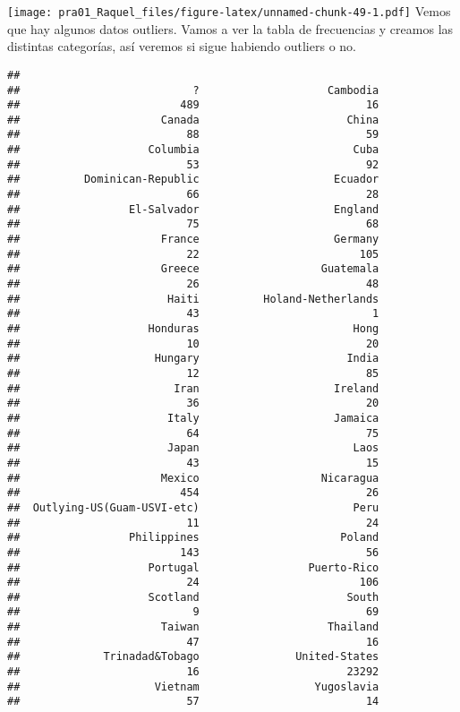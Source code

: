 \documentclass[]{article}
\newenvironment{Shaded}{\begin{snugshade}}{\end{snugshade}}
\newcommand{\DataTypeTok}[1]{\textcolor[rgb]{0.87,0.87,0.75}{#1}}
\newcommand{\KeywordTok}[1]{\textcolor[rgb]{0.94,0.87,0.69}{#1}}
\newcommand{\NormalTok}[1]{\textcolor[rgb]{0.80,0.80,0.80}{#1}}
\newcommand{\OperatorTok}[1]{\textcolor[rgb]{0.94,0.94,0.82}{#1}}
\newcommand{\StringTok}[1]{\textcolor[rgb]{0.80,0.58,0.58}{#1}}
\begin{document}
\texttt{[image: pra01\_Raquel\_files/figure-latex/unnamed-chunk-49-1.pdf]}
Vemos que hay algunos datos outliers. Vamos a ver la tabla de
frecuencias y creamos las distintas categorías, así veremos si sigue
habiendo outliers o no.

\begin{Shaded}
\end{Shaded}

\begin{verbatim}
## 
##                           ?                    Cambodia 
##                         489                          16 
##                      Canada                       China 
##                          88                          59 
##                    Columbia                        Cuba 
##                          53                          92 
##          Dominican-Republic                     Ecuador 
##                          66                          28 
##                 El-Salvador                     England 
##                          75                          68 
##                      France                     Germany 
##                          22                         105 
##                      Greece                   Guatemala 
##                          26                          48 
##                       Haiti          Holand-Netherlands 
##                          43                           1 
##                    Honduras                        Hong 
##                          10                          20 
##                     Hungary                       India 
##                          12                          85 
##                        Iran                     Ireland 
##                          36                          20 
##                       Italy                     Jamaica 
##                          64                          75 
##                       Japan                        Laos 
##                          43                          15 
##                      Mexico                   Nicaragua 
##                         454                          26 
##  Outlying-US(Guam-USVI-etc)                        Peru 
##                          11                          24 
##                 Philippines                      Poland 
##                         143                          56 
##                    Portugal                 Puerto-Rico 
##                          24                         106 
##                    Scotland                       South 
##                           9                          69 
##                      Taiwan                    Thailand 
##                          47                          16 
##             Trinadad&Tobago               United-States 
##                          16                       23292 
##                     Vietnam                  Yugoslavia 
##                          57                          14
\end{verbatim}
\end{document}
